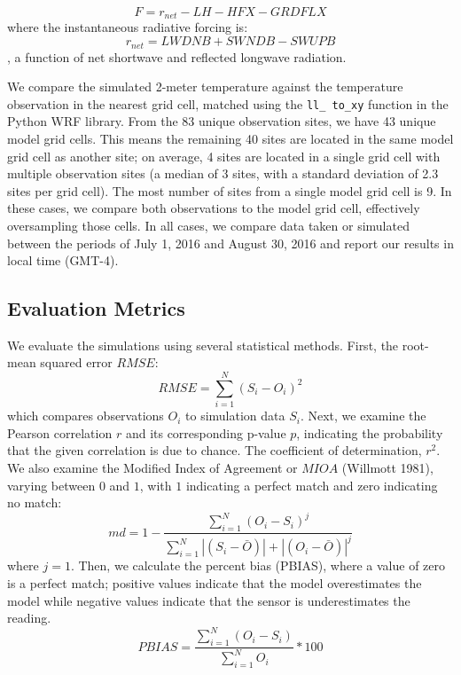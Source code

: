 \documentclass[draft,linenumbers]{agujournal}
\begin{document}
\begin{equation}
F= r_{net} -LH - HFX - GRDFLX
\end{equation}
where the instantaneous radiative forcing is: $$r_{net}=LWDNB + SWNDB-SWUPB$$, a function of net shortwave and reflected longwave radiation.   

We compare the simulated 2-meter temperature against the temperature observation in the nearest grid cell, matched using the \texttt{ll\_ to\_xy} function in the Python WRF library. 
From the 83 unique observation sites, we have 43 unique model grid cells. This means the remaining 40 sites are located in the same model grid cell as another site; on average, 4 sites are located in a single grid cell with multiple observation sites (a median of 3 sites, with a standard deviation of 2.3 sites per grid cell). The most number of sites from a single model grid cell is 9. In these cases, we compare both observations to the model grid cell, effectively oversampling those cells. 
In all cases, we compare data taken or simulated between the periods of July 1, 2016 and August 30, 2016 and report our results in local time (GMT-4). 

\subsection{Evaluation Metrics}
We evaluate the simulations using several statistical methods. 
First, the root-mean squared error $RMSE$:  
\begin{equation}%
RMSE = \sum_{i=1}^{N} \left(S_i - O_i\right)^2
\end{equation}
which compares observations $O_i$ to simulation data $S_i$.
Next, we examine the Pearson correlation $r$ and its corresponding p-value $p$, indicating the probability that the given correlation is due to chance. The coefficient of determination, $r^2$. We also examine the Modified Index of Agreement or $MIOA$ (Willmott 1981), varying between \(0\) and \(1\), with \(1\) indicating a perfect match and zero indicating no match: 
\begin{equation}
md = 1 - \frac{\sum_{i=1}^{N}(O_{i}-S_{i})^{j}}{\sum_{i=1}^{N}|(S_{i}-\bar{O})|+|(O_{i}-\bar{O})|^{j}}
\end{equation}
where $j=1$. 
Then, we calculate the percent bias (PBIAS), where a value of zero is a perfect match; positive values indicate that the model overestimates the model while negative values indicate that the sensor is underestimates the reading.
\begin{equation}
PBIAS = \frac{\sum_{i=1}^{N}(O_{i}-S_{i})}{\sum_{i=1}^{N}O_{i}}*100
\end{equation}
\end{document}

